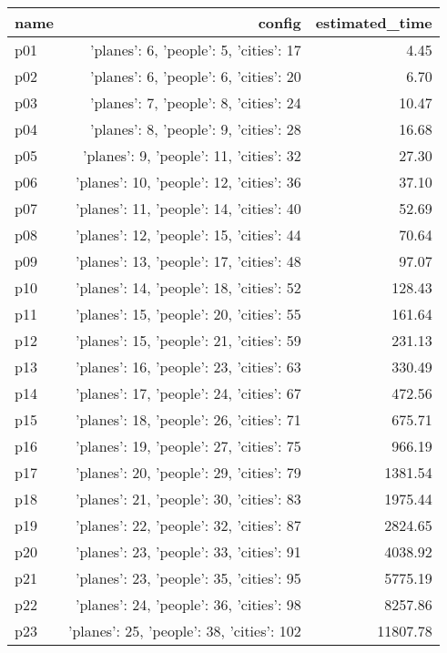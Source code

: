 \documentclass{article}
\begin{document}
                            \begin{center}
                            \scriptsize
                            \begin{tabular}{@{}l|r|r@{}}
                            name & config & estimated\_time\\\midrule
                              p01&{'planes': 6, 'people': 5, 'cities': 17}&4.45\\
  p02&{'planes': 6, 'people': 6, 'cities': 20}&6.70\\
  p03&{'planes': 7, 'people': 8, 'cities': 24}&10.47\\
  p04&{'planes': 8, 'people': 9, 'cities': 28}&16.68\\
  p05&{'planes': 9, 'people': 11, 'cities': 32}&27.30\\
  p06&{'planes': 10, 'people': 12, 'cities': 36}&37.10\\
  p07&{'planes': 11, 'people': 14, 'cities': 40}&52.69\\
  p08&{'planes': 12, 'people': 15, 'cities': 44}&70.64\\
  p09&{'planes': 13, 'people': 17, 'cities': 48}&97.07\\
  p10&{'planes': 14, 'people': 18, 'cities': 52}&128.43\\
  p11&{'planes': 15, 'people': 20, 'cities': 55}&161.64\\
  p12&{'planes': 15, 'people': 21, 'cities': 59}&231.13\\
  p13&{'planes': 16, 'people': 23, 'cities': 63}&330.49\\
  p14&{'planes': 17, 'people': 24, 'cities': 67}&472.56\\
  p15&{'planes': 18, 'people': 26, 'cities': 71}&675.71\\
  p16&{'planes': 19, 'people': 27, 'cities': 75}&966.19\\
  p17&{'planes': 20, 'people': 29, 'cities': 79}&1381.54\\
  p18&{'planes': 21, 'people': 30, 'cities': 83}&1975.44\\
  p19&{'planes': 22, 'people': 32, 'cities': 87}&2824.65\\
  p20&{'planes': 23, 'people': 33, 'cities': 91}&4038.92\\
  p21&{'planes': 23, 'people': 35, 'cities': 95}&5775.19\\
  p22&{'planes': 24, 'people': 36, 'cities': 98}&8257.86\\
  p23&{'planes': 25, 'people': 38, 'cities': 102}&11807.78\\

\end{tabular}
\end{center}
\end{document}
